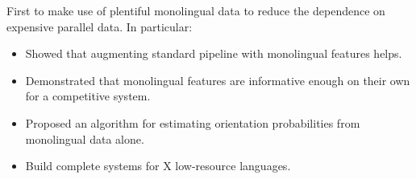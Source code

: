 \documentclass[11pt]{article}
\begin{document}
First to make use of plentiful monolingual data to reduce the dependence on expensive parallel data.  In particular:

\begin{itemize}
\item Showed that augmenting standard pipeline with monolingual features helps.
\item Demonstrated that monolingual features are informative enough on their own for a competitive system.
\item Proposed an algorithm for estimating orientation probabilities from monolingual data alone.
\item Build complete systems for X low-resource languages.
\end{itemize}




\end{document}
